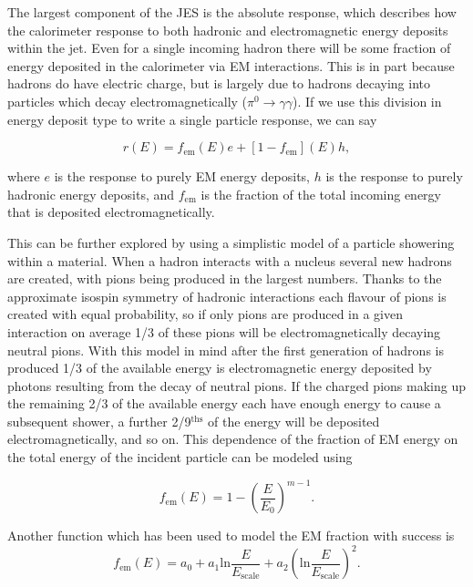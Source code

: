 The largest component of the JES is the absolute response, which describes how the calorimeter response to both hadronic and electromagnetic energy deposits within the jet.  
Even for a single incoming hadron there will be some fraction of energy deposited in the calorimeter via EM interactions.  
This is in part because hadrons do have electric charge, but is largely due to hadrons decaying into particles which decay electromagnetically ($\pi^0\rightarrow\gamma\gamma$).  
If we use this division in energy deposit type to write a single particle response, we can say

\begin{equation}
  \label{SingleParticleResponse}
  r(E)=f_{\mathrm{em}}\left(E\right)e+\left[1-f_{\mathrm{em}}\right]\left(E\right)h,
 \end{equation}

\noindent
where $e$ is the response to purely EM energy deposits, $h$ is the response to purely hadronic energy deposits, and $f_{\mathrm{em}}$ is the fraction of the total incoming energy that is deposited electromagnetically.  

This can be further explored by using a simplistic model of a particle showering within a material.  
When a hadron interacts with a nucleus several new hadrons are created, with pions being produced in the largest numbers.  
Thanks to the approximate isospin symmetry of hadronic interactions each flavour of pions is created with equal probability, so if only pions are produced in a given interaction on average 1/3 of these pions will be electromagnetically decaying neutral pions.  
With this model in mind after the first generation of hadrons is produced 1/3 of the available energy is electromagnetic energy deposited by photons resulting from the decay of neutral pions.  
If the charged pions making up the remaining 2/3 of the available energy each have enough energy to cause a subsequent shower, a further 2/9$^{\mathrm{ths}}$ of the energy will be deposited electromagnetically, and so on.  
This dependence of the fraction of EM energy on the total energy of the incident particle can be modeled using

\begin{equation}
  \label{Grooms}
  f_{\mathrm{em}}\left(E\right)=1-\left(\frac{E}{E_0}\right)^{m-1}.
\end{equation} 

\noindent 
Another function which has been used to model the EM fraction with success is 
\begin{equation}
  \label{Wigmans}
  f_{\mathrm{em}}\left(E\right)=a_0+a_1\mathrm{ln}\frac{E}{E_{\mathrm{scale}}}+a_2\left(\mathrm{ln}\frac{E}{E_{\mathrm{scale}}}\right)^2.
\end{equation}

